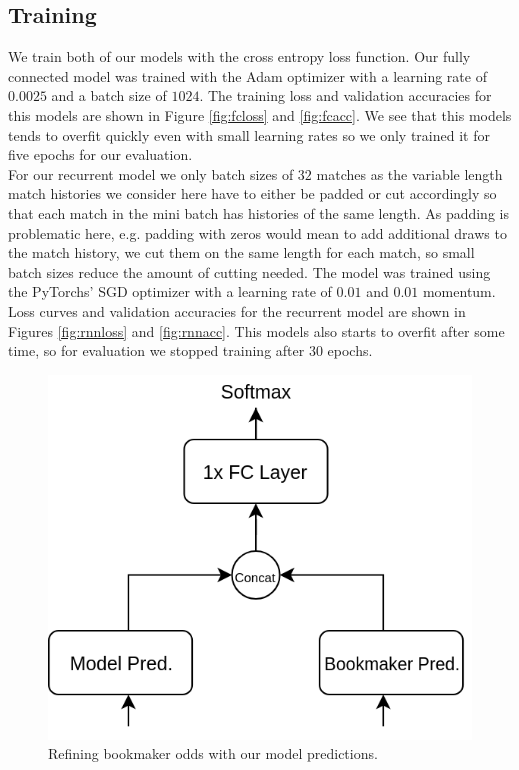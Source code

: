 \documentclass[a4paper]{article}
\begin{document}
\subsection{Training}
We train both of our models with the cross entropy loss function. Our fully connected model was trained with the Adam \cite{Adam} optimizer with a learning rate of $0.0025$ and a batch size of $1024$. The training loss and validation accuracies for this models are shown in Figure \ref{fig:fcloss} and \ref{fig:fcacc}. We see that this models tends to overfit quickly even with small learning rates so we only trained it for five epochs for our evaluation. \\
For our recurrent model we only batch sizes of $32$ matches as the variable length match histories we consider here have to either be padded or cut accordingly so that each match in the mini batch has histories of the same length. As padding is problematic here, e.g. padding with zeros would mean to add additional draws to the match history, we cut them on the same length for each match, so small batch sizes reduce the amount of cutting needed. The model was trained using the PyTorchs' SGD optimizer with a learning rate of $0.01$ and $0.01$ momentum. Loss curves and validation accuracies for the recurrent model are shown in Figures \ref{fig:rnnloss} and \ref{fig:rnnacc}. This models also starts to overfit after some time, so for evaluation we stopped training after 30 epochs. 



\begin{figure} 
\includegraphics[scale=0.28]{img/Siamese3.png}
\caption{Refining bookmaker odds with our model predictions.}
\label{fig:oddsref}
\end{figure}
\end{document}
